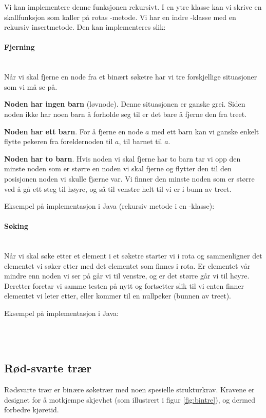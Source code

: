 Vi kan implementere denne funksjonen rekursivt. I en ytre klasse kan vi skrive en skallfunksjon som kaller på rotas -metode. Vi har en indre -klasse med en rekursiv insertmetode. Den kan implementeres slik:


\paragraph{Fjerning}~\\
Når vi skal fjerne en node fra et binært søketre har vi tre forskjellige situasjoner som vi må se på.

{\bfseries Noden har ingen barn} (løvnode). Denne situasjonen er ganske grei. Siden noden ikke har noen barn å forholde seg til er det bare å fjerne den fra treet.

{\bfseries Noden har ett barn}. For å fjerne en node $ a $ med ett barn kan vi ganske enkelt flytte pekeren fra foreldernoden til $ a $, til barnet til $ a $.

{\bfseries Noden har to barn}. Hvis noden vi skal fjerne har to barn tar vi opp den minste noden som er større en noden vi skal fjerne og flytter den til den posisjonen noden vi skulle fjærne var. Vi finner den minste noden som er større ved å gå ett steg til høyre, og så til venstre helt til vi er i bunn av treet. 

Eksempel på implementasjon i Java (rekursiv metode i en -klasse):


\paragraph{Søking}~\\
Når vi skal søke etter et element i et søketre starter vi i rota og sammenligner det elementet vi søker etter med det elementet som finnes i rota. Er elementet vår mindre enn noden vi ser på går vi til venstre, og er det større går vi til høyre. Deretter foretar vi samme testen på nytt og fortsetter slik til vi enten finner elementet vi leter etter, eller kommer til en nullpeker (bunnen av treet).

Eksempel på implementasjon i Java:





~\\~\\
\subsection{Rød-svarte trær} \label{rb_tre}
Rødsvarte trær er binære søketrær med noen spesielle strukturkrav. Kravene er designet for å motkjempe skjevhet (som illustrert i figur \ref{fig:bintre}), og dermed forbedre kjøretid.

